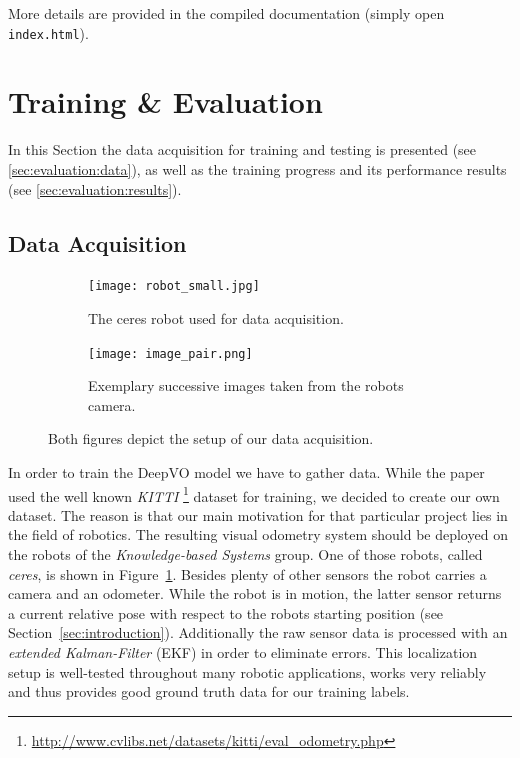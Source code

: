 \documentclass[a4paper,11pt]{article}
\begin{document}
More details are provided in the compiled documentation (simply open
\texttt{index.html}).

\section{Training \& Evaluation}
\label{sec:evaluation}
In this Section the data acquisition for training and testing is presented (see
\autoref{sec:evaluation:data}), as well as the training progress and its
performance results (see \autoref{sec:evaluation:results}).


\subsection{Data Acquisition}
\label{sec:evaluation:data}
\begin{figure}[htb]
    \centering
    \begin{subfigure}[t]{0.6\linewidth}
            \centering
            \texttt{[image: robot\_small.jpg]}
            \caption[]{The ceres robot used for data acquisition.}
            \label{fig:robot}
    \end{subfigure}
    \begin{subfigure}[t]{0.39\linewidth}
            \centering
            \texttt{[image: image\_pair.png]}
            \caption[]{Exemplary successive images taken from the robots camera.}
            \label{fig:camera_images}
    \end{subfigure}
    \caption[]{Both figures depict the setup of our data acquisition.}
    \label{fig:setup}
\end{figure}

In order to train the DeepVO model we have to gather data. While the paper used the well known \emph{KITTI} \footnote{\url{http://www.cvlibs.net/datasets/kitti/eval_odometry.php}} dataset for training, we decided to create our own dataset. The reason is that our main motivation for that particular project lies in the field of robotics. The resulting visual odometry system should be deployed on the robots of the \emph{Knowledge-based Systems} group. One of those robots, called \emph{ceres}, is shown in Figure~\ref{fig:robot}. Besides plenty of other sensors the robot carries a camera and an odometer. While the robot is in motion, the latter sensor returns a current relative pose with respect to the robots starting position (see Section~\ref{sec:introduction}). Additionally the raw sensor data is processed with an \emph{extended Kalman-Filter} (EKF) in order to eliminate errors. This localization setup is well-tested throughout many robotic applications, works very reliably and thus provides good ground truth data for our training labels.
\end{document}
